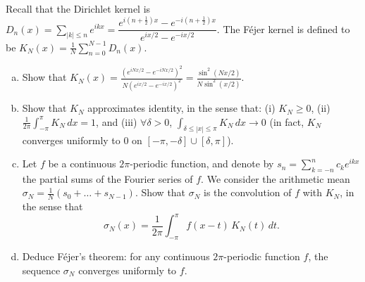\documentclass[11pt,letterpaper]{article}
\begin{document}
\begin{problem}
    Recall that the Dirichlet kernel is $D_n(x) = \sum\limits_{|k|\leq n} e^{ikx} = \dfrac{e^{i(n+\frac12)x}-e^{-i(n+\frac12)x}}{e^{ix/2}-e^{-ix/2}}$. The F\'ejer kernel is defined to be $K_N(x)=\frac{1}{N} \sum\limits_{n=0}^{N-1} D_n(x)$.
    \begin{enumerate}[(a)]
        \item Show that $\displaystyle K_N(x)=\frac{(e^{iNx/2}-e^{-iNx/2})^2}{N(e^{ix/2}-e^{-ix/2})^2}= \frac{\sin^2(Nx/2)}{N\sin^2(x/2)}$.
        \item Show that $K_N$ approximates identity, in the sense that: (i) $K_N\geq 0$, (ii) $\frac{1}{2\pi}\int_{-\pi}^{\pi} K_N\,dx=1$, and (iii) $\forall \delta>0$, $\int_{\delta\leq |x|\leq \pi} K_N\,dx\to 0$ (in fact, $K_N$ converges uniformly to 0 on $[-\pi,-\delta]\cup [\delta,\pi]$).
        \item Let $f$ be a continuous $2\pi$-periodic function, and denote by $s_n=\sum_{k=-n}^n c_k e^{ikx}$ the partial sums of the Fourier series of $f$. We consider the arithmetic mean $\sigma_N=\frac{1}{N}(s_0+\dots+s_{N-1})$.
        Show that $\sigma_N$ is the convolution of $f$ with $K_N$, in the sense that
        $$\sigma_N(x)=\frac{1}{2\pi}\int_{-\pi}^{\pi} f(x-t)\,K_N(t)\,dt.$$
        \item Deduce F\'ejer's theorem: for any continuous $2\pi$-periodic function $f$, the sequence $\sigma_N$ converges uniformly to $f$.
    \end{enumerate}
\end{problem}
\end{document}
